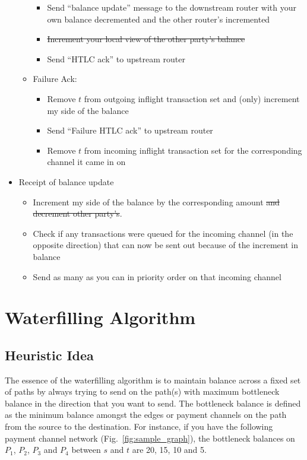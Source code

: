 \documentclass[a4paper]{article}
\begin{document}
\begin{itemize}
\begin{itemize}
\begin{itemize}
                    \item Send ``balance update'' message to the downstream router with your own balance decremented and the other router's incremented
                    \item \sout{Increment your local view of the other party's balance}
                    \item Send ``HTLC ack'' to upstream router
                \end{itemize}
            \item Failure Ack:
                \begin{itemize}
                    \item Remove $t$ from outgoing inflight transaction set and (only) increment my side of the balance
                    \item Send ``Failure HTLC ack'' to upstream router
                    \item Remove $t$ from incoming inflight transaction set for the corresponding channel it came in on
                \end{itemize}

        \end{itemize}
    \item Receipt of balance update
        \begin{itemize}
            \item Increment my side of the balance by the corresponding amount \sout{and decrement other party's}.
            \item Check if any transactions were queued for the incoming channel (in the opposite direction) that can now be sent out because of the increment in balance
            \item Send as many as you can in priority order on that incoming channel

        \end{itemize}
\end{itemize}

\section{Waterfilling Algorithm}
\subsection{Heuristic Idea}
The essence of the waterfilling algorithm is to maintain balance across a fixed set of paths by always trying to send on the path(s) with maximum bottleneck balance
in the direction that you want to send. The bottleneck balance is defined as the minimum balance amongst the edges or payment channels on the path from the source
to the destination. For instance, if you have the following payment channel network (Fig.~\ref{fig:sample_graph}), the bottleneck balances on $P_1$, $P_2$, $P_3$ and $P_4$ between $s$ and $t$
are 20, 15, 10 and 5.
\end{document}
